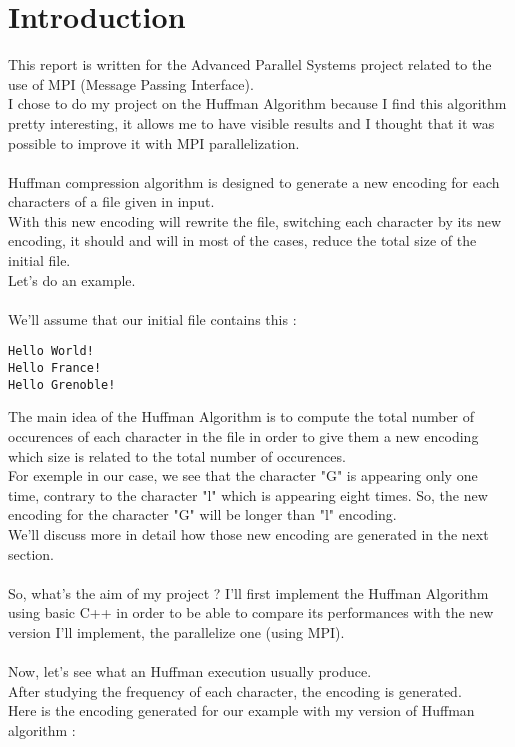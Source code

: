 \section{Introduction}
This report is written for the Advanced Parallel Systems project related to the use of MPI (Message Passing Interface).\\
I chose to do my project on the Huffman Algorithm because I find this algorithm pretty interesting, it allows me to have visible results and I thought that it was possible to improve it with MPI parallelization.\\
\\
Huffman compression algorithm is designed to generate a new encoding for each characters of a file given in input.\\
With this new encoding will rewrite the file, switching each character by its new encoding, it should and will in most of the cases, reduce the total size of the initial file.\\
Let's do an example.\\
\\
We'll assume that our initial file contains this :
\begin{verbatim}
Hello World!
Hello France!
Hello Grenoble!
\end{verbatim}
The main idea of the Huffman Algorithm is to compute the total number of occurences of each character in the file in order to give them a new encoding which size is related to the total number of occurences.\\
For exemple in our case, we see that the character "G" is appearing only one time, contrary to the character "l" which is appearing eight times. So, the new encoding for the character "G" will be longer than "l" encoding.\\
We'll discuss more in detail how those new encoding are generated in the next section.\\
\\
So, what's the aim of my project ? I'll first implement the Huffman Algorithm using basic C++ in order to be able to compare its performances with the new version I'll implement, the parallelize one (using MPI).\\
\\
Now, let's see what an Huffman execution usually produce.\\
After studying the frequency of each character, the encoding is generated.\\
Here is the encoding generated for our example with my version of Huffman algorithm :

